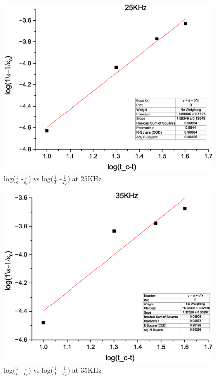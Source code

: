 			\begin{figure}[H]
				\centering
				\label{graph:8}
				\includegraphics[width=0.8\columnwidth]{images/g8.eps}
				\caption{log($\frac{1}{\epsilon}$ -$\frac{1}{\epsilon_c}$) vs log($\frac{1}{T}$ -$\frac{1}{T_c}$)  at 25KHz}
			\end{figure}
			\begin{figure}[H]
				\centering
				\label{graph:9}
				\includegraphics[width=0.8\columnwidth]{images/g9.eps}
				\caption{log($\frac{1}{\epsilon}$ -$\frac{1}{\epsilon_c}$) vs log($\frac{1}{T}$ -$\frac{1}{T_c}$)  at 35KHz}
			\end{figure}
